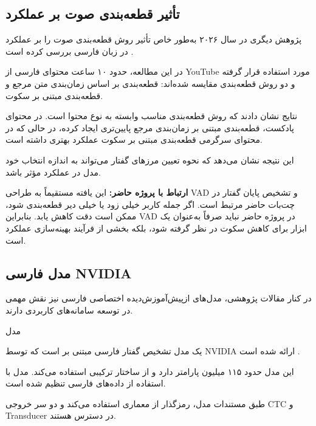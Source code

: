 \subsection{تأثیر قطعه‌بندی صوت بر عملکرد }

پژوهش دیگری در سال ۲۰۲۶ به‌طور خاص تأثیر روش
قطعه‌بندی صوت را بر عملکرد  در زبان فارسی بررسی کرده
است
\cite{iranmanesh2026segmentation}.

در این مطالعه، حدود ۱۰ ساعت محتوای فارسی از YouTube مورد
استفاده قرار گرفته و دو روش قطعه‌بندی مقایسه شده‌اند:
قطعه‌بندی بر اساس زمان‌بندی متن مرجع و قطعه‌بندی مبتنی بر
سکوت.

نتایج نشان دادند که روش قطعه‌بندی مناسب وابسته به نوع محتوا
است.
در محتوای پادکست، قطعه‌بندی مبتنی بر زمان‌بندی مرجع 
پایین‌تری ایجاد کرده، در حالی که در محتوای سرگرمی
قطعه‌بندی مبتنی بر سکوت عملکرد بهتری داشته است.

این نتیجه نشان می‌دهد که نحوه تعیین مرزهای گفتار می‌تواند
به اندازه انتخاب خود مدل در عملکرد  مؤثر باشد.

\textbf{ارتباط با پروژه حاضر:}
این یافته مستقیماً به طراحی VAD و تشخیص پایان گفتار در
چت‌بات حاضر مرتبط است.
اگر جمله کاربر خیلی زود یا خیلی دیر قطعه‌بندی شود،
ممکن است دقت  کاهش یابد.
بنابراین VAD در پروژه حاضر نباید صرفاً به‌عنوان یک ابزار
برای کاهش سکوت در نظر گرفته شود، بلکه بخشی از فرآیند
بهینه‌سازی عملکرد  است.


\subsection{مدل  فارسی NVIDIA}

در کنار مقالات پژوهشی، مدل‌های ازپیش‌آموزش‌دیده اختصاصی فارسی
نیز نقش مهمی در توسعه سامانه‌های کاربردی دارند.

مدل

\begin{center}
\end{center}

یک مدل تشخیص گفتار فارسی مبتنی بر
است که توسط NVIDIA ارائه شده است
\cite{nvidiaPersianFastConformer}.

این مدل حدود ۱۱۵ میلیون پارامتر دارد و از ساختار ترکیبی
استفاده می‌کند.
مدل با استفاده از داده‌های فارسی
تنظیم شده است.

طبق مستندات مدل، رمزگذار از معماری  استفاده
می‌کند و دو سر خروجی CTC و Transducer در دسترس هستند.

